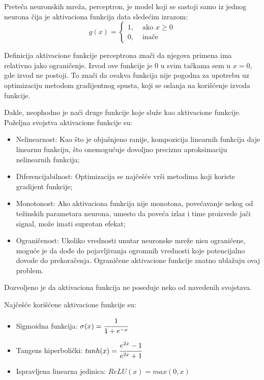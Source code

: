 Preteča neuronskih mreža, perceptron, je model koji se sastoji samo iz jednog neurona čija je aktivaciona funkcija data sledećim izrazom:
\begin{equation}
	g(x)=
	\begin{cases}
		1, 	& \text{~ako~} x \geq 0 \\
		0, 	& \text{~inače}
	\end{cases}
\end{equation} 
\par
Definicija aktivacione funkcije perceptrona znači da njegova primena ima relativno jako ograničenje. Izvod ove funkcije je $0$ u svim tačkama sem u $x=0$, gde izvod ne postoji. To znači da ovakva funkcija nije pogodna za upotrebu uz optimizaciju metodom gradijentnog spusta, koji se oslanja na korišćenje izvoda funkcije.
\par
Dakle, neophodno je naći druge funkcije koje služe kao aktivacione funkcije. Poželjna svojstva aktivacione funkcije su:
\begin{itemize}
	\item Nelinearnost: Kao što je objašnjeno ranije, kompozicija linearnih funkcija daje linearnu funkciju, što onemogućuje dovoljno preciznu aproksimaciju nelinearnih funkcija;
	\item Diferencijabilnost: Optimizacija se najčešće vrši metodima koji koriste gradijent funkcije;
	\item Monotonost: Ako aktivaciona funkcija nije monotona, povećavanje nekog od težinskih parametara neurona, umesto da poveća izlaz i time proizvede jači signal, može imati suprotan efekat;
	\item Ograničenost: Ukoliko vrednosti unutar neuronske mreže nisu ograničene, moguće je da dođe do pojavljivanja ogromnih vrednosti koje potencijalno dovode do prekoračenja. Ograničene aktivacione funkcije znatno ublažuju ovaj problem. 
\end{itemize}
Dozvoljeno je da aktivaciona funkcija ne poseduje neko od navedenih svojstava.
\par
Najčešće korišćene aktivacione funkcije su:
\begin{itemize}
	\item Sigmoidna funkcija: $\sigma (x) = \cfrac{1}{1+e^{-x}}$
	\item Tangens hiperbolički: $tanh(x) = \cfrac{e^{2x}-1}{e^{2x}+1}$
	\item Ispravljena linearna jedinica: $ReLU(x) = max(0, x)$
\end{itemize}

